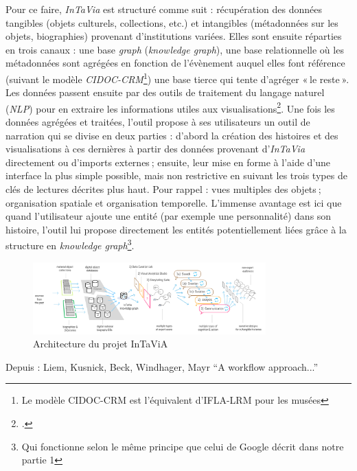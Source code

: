 Pour ce faire, \textit{InTaVia} est structuré comme suit : récupération des données tangibles (objets culturels, collections, etc.) et intangibles (métadonnées sur les objets, biographies) provenant d’institutions variées. Elles sont ensuite réparties en trois canaux : une base \textit{graph} (\textit{knowledge graph}), une base relationnelle où les métadonnées sont agrégées en fonction de l’évènement auquel elles font référence (suivant le modèle \textit{CIDOC-CRM}\footnote{Le modèle CIDOC-CRM est l'équivalent d'IFLA-LRM pour les musées}) une base tierce qui tente d’agréger « le reste ». Les données passent ensuite par des outils de traitement du langage naturel (\textit{NLP}) pour en extraire les informations utiles aux visualisations\footcite{noauthor_overall_nodate}. Une fois les données agrégées et traitées, l’outil propose à ses utilisateurs un outil de narration qui se divise en deux parties : d’abord la création des histoires et des visualisations à ces dernières à partir des données provenant d’\textit{InTaVia} directement ou d’imports externes ; ensuite, leur mise en forme à l’aide d’une interface la plus simple possible, mais non restrictive en suivant les trois types de clés de lectures décrites plus haut. Pour rappel : vues multiples des objets ; organisation spatiale et organisation temporelle. L’immense avantage est ici que quand l’utilisateur ajoute une entité (par exemple une personnalité) dans son histoire, l’outil lui propose directement les entités potentiellement liées grâce à la structure en \textit{knowledge graph}\footnote{Qui fonctionne selon le même principe que celui de Google décrit dans notre partie 1}.


\begin{figure}[h!]
	\centering
	\includegraphics[width=0.8\textwidth]{images/image18.png}
	\caption{Architecture du projet InTaViA}
	\label{fig:image18}
\end{figure}


\begin{center}
	Depuis : Liem, Kusnick, Beck, Windhager, Mayr \enquote{A workflow approach...}
\end{center}

